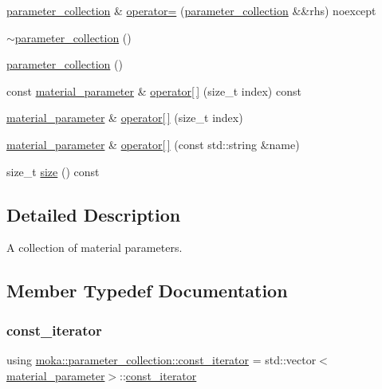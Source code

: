 \begin{DoxyCompactItemize}
\mbox{\hyperlink{classmoka_1_1parameter__collection}{parameter\+\_\+collection}} \& \mbox{\hyperlink{classmoka_1_1parameter__collection_a1bc00e9569052d8851e54997ef1dcc5c}{operator=}} (\mbox{\hyperlink{classmoka_1_1parameter__collection}{parameter\+\_\+collection}} \&\&rhs) noexcept
\item 
\mbox{\hyperlink{classmoka_1_1parameter__collection_a1b0d2b9b9b86e1de98ceb2262cf14935}{$\sim$parameter\+\_\+collection}} ()
\item 
\mbox{\hyperlink{classmoka_1_1parameter__collection_a95759ce039eba581957b9f87bc163000}{parameter\+\_\+collection}} ()
\item 
const \mbox{\hyperlink{structmoka_1_1material__parameter}{material\+\_\+parameter}} \& \mbox{\hyperlink{classmoka_1_1parameter__collection_a594b3fe2f55babcc56b1edb35994b789}{operator\mbox{[}$\,$\mbox{]}}} (size\+\_\+t index) const
\item 
\mbox{\hyperlink{structmoka_1_1material__parameter}{material\+\_\+parameter}} \& \mbox{\hyperlink{classmoka_1_1parameter__collection_a0ffaa248546c9de9d9b8abf9bb125ad8}{operator\mbox{[}$\,$\mbox{]}}} (size\+\_\+t index)
\item 
\mbox{\hyperlink{structmoka_1_1material__parameter}{material\+\_\+parameter}} \& \mbox{\hyperlink{classmoka_1_1parameter__collection_a9053cc6ee2a14d347b3ca12b2a23f4b3}{operator\mbox{[}$\,$\mbox{]}}} (const std\+::string \&name)
\item 
size\+\_\+t \mbox{\hyperlink{classmoka_1_1parameter__collection_a4e553f37469125fc4191889134761ff7}{size}} () const
\end{DoxyCompactItemize}


\subsection{Detailed Description}
A collection of material parameters. 

\subsection{Member Typedef Documentation}
\mbox{\label{classmoka_1_1parameter__collection_a6d2ad87d4e43742300cb9ded3beee731}} 
\subsubsection{\texorpdfstring{const\_iterator}{const\_iterator}}
{\footnotesize\ttfamily using \mbox{\hyperlink{classmoka_1_1parameter__collection_a6d2ad87d4e43742300cb9ded3beee731}{moka\+::parameter\+\_\+collection\+::const\+\_\+iterator}} =  std\+::vector$<$\mbox{\hyperlink{structmoka_1_1material__parameter}{material\+\_\+parameter}}$>$\+::\mbox{\hyperlink{classmoka_1_1parameter__collection_a6d2ad87d4e43742300cb9ded3beee731}{const\+\_\+iterator}}}


